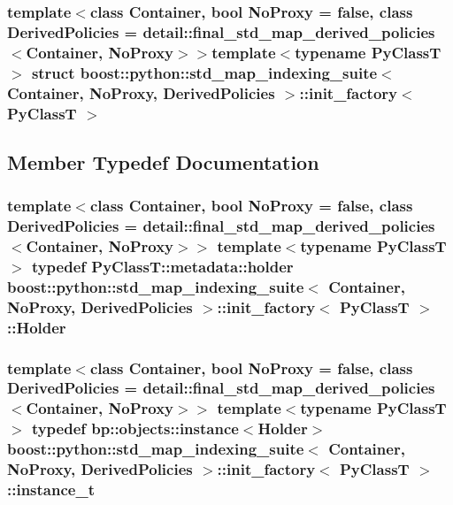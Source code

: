 \subsubsection*{template$<$class \-Container, bool \-No\-Proxy = false, class \-Derived\-Policies = detail\-::final\-\_\-std\-\_\-map\-\_\-derived\-\_\-policies$<$\-Container, No\-Proxy$>$$>$template$<$typename Py\-Class\-T$>$ struct boost\-::python\-::std\-\_\-map\-\_\-indexing\-\_\-suite$<$ Container, No\-Proxy, Derived\-Policies $>$\-::init\-\_\-factory$<$ Py\-Class\-T $>$}



\subsection{\-Member \-Typedef \-Documentation}
\hypertarget{structboost_1_1python_1_1std__map__indexing__suite_1_1init__factory_a785b4c017210dd048b47eb6c04a5cdc6}{
\subsubsection[{\-Holder}]{\setlength{\rightskip}{0pt plus 5cm}template$<$class \-Container, bool \-No\-Proxy = false, class \-Derived\-Policies = detail\-::final\-\_\-std\-\_\-map\-\_\-derived\-\_\-policies$<$\-Container, No\-Proxy$>$$>$ template$<$typename Py\-Class\-T $>$ typedef \-Py\-Class\-T\-::metadata\-::holder {\bf boost\-::python\-::std\-\_\-map\-\_\-indexing\-\_\-suite}$<$ \-Container, \-No\-Proxy, \-Derived\-Policies $>$\-::{\bf init\-\_\-factory}$<$ \-Py\-Class\-T $>$\-::{\bf \-Holder}}}\label{structboost_1_1python_1_1std__map__indexing__suite_1_1init__factory_a785b4c017210dd048b47eb6c04a5cdc6}
\hypertarget{structboost_1_1python_1_1std__map__indexing__suite_1_1init__factory_aea2971d45c2f4de6ac83494b504d9a19}{
\subsubsection[{instance\-\_\-t}]{\setlength{\rightskip}{0pt plus 5cm}template$<$class \-Container, bool \-No\-Proxy = false, class \-Derived\-Policies = detail\-::final\-\_\-std\-\_\-map\-\_\-derived\-\_\-policies$<$\-Container, No\-Proxy$>$$>$ template$<$typename Py\-Class\-T $>$ typedef bp\-::objects\-::instance$<${\bf \-Holder}$>$ {\bf boost\-::python\-::std\-\_\-map\-\_\-indexing\-\_\-suite}$<$ \-Container, \-No\-Proxy, \-Derived\-Policies $>$\-::{\bf init\-\_\-factory}$<$ \-Py\-Class\-T $>$\-::{\bf instance\-\_\-t}}}\label{structboost_1_1python_1_1std__map__indexing__suite_1_1init__factory_aea2971d45c2f4de6ac83494b504d9a19}


